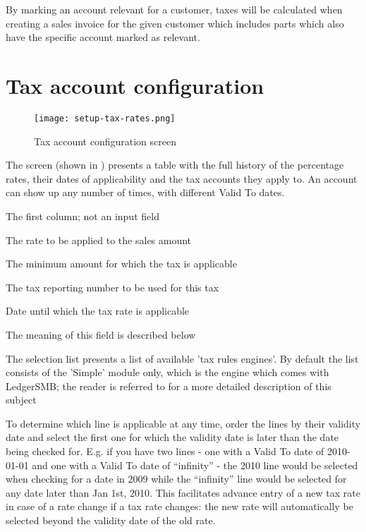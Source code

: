 By marking an account relevant for a \gls{customer}, taxes will be calculated when
creating a sales invoice for the given customer which includes parts which also
have the specific account marked as relevant.

\section{Tax account configuration}
\label{sec-tax-account-configuration}

\begin{figure}[h]
\centering
\texttt{[image: setup-tax-rates.png]}
\caption{Tax account configuration screen}
\end{figure}
\label{fig:tax-account-config-screen}

The screen (shown in ) presents a table with
the full history of the percentage rates, their dates of applicability and the tax
accounts they apply to. An account can show up any number of times, with different
Valid To dates.

\begin{description}[style=nextline]
\item [Account name] The first column; not an input field
\item [Rate (\%)] The rate to be applied to the sales amount
\item [Min Taxable] The minimum amount for which the tax is applicable
\item [Number] The tax reporting number to be used for this tax
\item [Valid To] Date until which the tax rate is applicable
\item [Ordering] The meaning of this field is described below
\item [Tax Rules] The selection list presents a list of available 'tax rules engines'. By
   default the list consists of the 'Simple' module only, which is the engine which comes
   with LedgerSMB; the reader is referred to  for a more detailed
   description of this subject
\end{description}

To determine which line is applicable at any time, order the lines by their validity date and
select the first one for which the validity date is later than the date being checked for. E.g.
if you have two lines - one with a Valid To date of 2010-01-01 and one with a Valid To date of
``infinity'' - the 2010 line would be selected when checking for a date in 2009 while the ``infinity''
line would be selected for any date later than Jan 1st, 2010. This facilitates advance entry of a new
tax rate in case of a rate change if a tax rate changes: the new rate will automatically be selected
beyond the validity date of the old rate.

